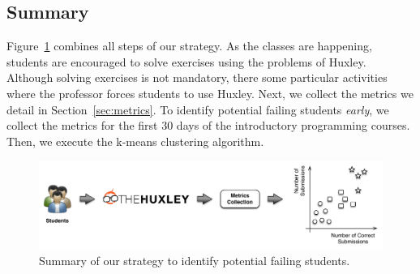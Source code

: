 \subsection{Summary}

Figure~\ref{fig:strategy} combines all steps of our strategy. As the classes are happening, students are encouraged to solve exercises using the problems of Huxley. Although solving exercises is not mandatory, there some particular activities where the professor forces students to use Huxley. Next, we collect the metrics we detail in Section~\ref{sec:metrics}. To identify potential failing students \textit{early}, we collect the metrics for the first 30 days of the introductory programming courses. Then, we execute the k-means clustering algorithm.


\begin{figure}[htb]
\centering
\includegraphics[width=1.0\textwidth,natwidth=610,natheight=642]{images/Strategy.pdf}
\caption{Summary of our strategy to identify potential failing students.}
\label{fig:strategy}
\end{figure}
